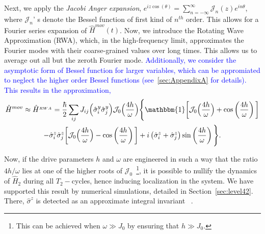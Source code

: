 \documentclass[12pt]{iopart}
\newcommand{\blue}[1]{\textcolor{blue}{#1}}
\begin{document}
Next, we apply the \textit{Jacobi Anger expansion}, $\displaystyle e^{iz \cos(\theta)} = \sum_{n=-\infty}^{\infty} \mathcal{J}_n(z) e^{in\theta}$, where $\mathcal{J}_n$' s denote the Bessel function of first kind of $n^{th}$ order. This allows for a Fourier series expansion of $\hat{H}^{mov}(t)$. Now, we introduce the Rotating Wave Approximation (RWA), which, in the high-frequency limit, approximates the Fourier modes with their coarse-grained values over long times. This allows us to average out all but the zeroth Fourier mode. \blue{Additionally, we consider the asymptotic form of Bessel function for larger variables, which can be appromiated to neglect the higher order Bessel functions (see~\ref{sec:AppendixA} for details). This results in the approximation,}
\begin{multline}
    \hat{H}^{mov}\approx \hat{H}^{_{RWA}} = \frac{\hbar}{2}\sum_{ij} J_{ij} \Big(\hat{\sigma}^y_i\hat{\sigma}^y_j\Big) \mathcal{J}_0\Big(\frac{4h}{\omega}\Big)\Bigg\{\mathbbm{1}\bigg[\mathcal{J}_0\Big(\frac{4h}{\omega}\Big) + \cos\left(\frac{4h}{\omega}\right)\bigg] \\
    -\hat{\sigma}^z_i\hat{\sigma}^z_j \bigg[\mathcal{J}_0\Big(\frac{4h}{\omega}\Big) - \cos\left(\frac{4h}{\omega}\right)\bigg] + i \left(\hat{\sigma}^z_i + \hat{\sigma}^z_j\right) \sin\left(\frac{4h}{\omega}\right)\Bigg\}.
    \label{eq:movham1}
\end{multline}
	
Now, if the drive parameters $h$ and $\omega$  are {engineered} in such a way that the ratio ${4h}/{\omega}$ lies at one of the higher roots of $\mathcal{J}_0$~\footnote{This can be achieved when $\omega \gg J_0$ by ensuring that $h\gg J_0$.}, it is possible to nullify the dynamics of $\hat{H}_2$ during all $T_2-$cycles, hence inducing localization in the system. We have supported this result by numerical simulations, detailed in Section~\ref{sec:level42}. There, $\hat{\sigma}^z$ is detected as an approximate integral invariant ~\cite{Keser2016,Dodonov1978}. 
\end{document}
